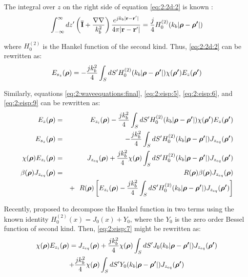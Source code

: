 			The integral over $z$ on the right side of equation \eqref{eq:2:2d:2} is known \citep{balanis2012advanced}:
			\begin{equation}
				\int_{-\infty}^{\infty}dz^\prime\left(\mathbf{\bar{I}} + \frac{\nabla\nabla}{k_b^2}\right) \frac{e^{jk_b|\mathbf{r}-\mathbf{r^\prime}|}}{4\pi|\mathbf{r}-\mathbf{r^\prime}|}  = \frac{j}{4}H_0^{(2)}(k_b|\boldsymbol{\rho}-\boldsymbol{\rho^\prime}|) \label{eq:2:2d:3}
			\end{equation}
		
			\noindent where $H_0^{(2)}$ is the Hankel function of the second kind. Thus, \eqref{eq:2:2d:2} can be rewritten as:
			\begin{equation}
				E_{s_z}(\boldsymbol{\rho}) = -\frac{jk_b^2}{4} \int_S dS^\prime H_0^{(2)}(k_b|\boldsymbol{\rho}-\boldsymbol{\rho^\prime}|) \chi(\boldsymbol{\rho^\prime}) E_z(\boldsymbol{\rho^\prime})\label{eq:2:2d:4}
			\end{equation}
		
			Similarly, equations  \eqref{eq:2:waveequations:final}, \eqref{eq:2:eisp:5}, \eqref{eq:2:eisp:6}, and \eqref{eq:2:eisp:9} can be rewritten as:
			\begin{eqnarray}
				E_z(\boldsymbol{\rho}) &=& E_{z_i}(\boldsymbol{\rho}) - \frac{jk_b^2}{4} \int_S dS^\prime H_0^{(2)}(k_b|\boldsymbol{\rho}-\boldsymbol{\rho^\prime}|) \chi(\boldsymbol{\rho^\prime}) E_z(\boldsymbol{\rho^\prime}) \label{eq:2:2d:5} \\
				E_{s_z}(\boldsymbol{\rho}) &=& -\frac{jk_b^2}{4} \int_S dS^\prime H_0^{(2)}(k_b|\boldsymbol{\rho}-\boldsymbol{\rho^\prime}|) J_{z_{eq}}(\boldsymbol{\rho^\prime}) \label{eq:2:2d:6} \\
				\chi(\boldsymbol{\rho})E_{z_i}(\boldsymbol{\rho}) &=& J_{z_{eq}}(\boldsymbol{\rho}) + \frac{jk_b^2}{4} \chi(\boldsymbol{\rho}) \int_S dS^\prime H_0^{(2)}(k_b|\boldsymbol{\rho}-\boldsymbol{\rho^\prime}|) J_{z_{eq}}(\boldsymbol{\rho^\prime}) \label{eq:2:2d:7} \\
				\beta(\boldsymbol{\rho})J_{z_{eq}}(\boldsymbol{\rho}) &=& R(\boldsymbol{\rho})\beta(\boldsymbol{\rho})J_{z_{eq}}(\boldsymbol{\rho}) \nonumber \\ && +~~ R(\boldsymbol{\rho})\left[ E_{z_i}(\boldsymbol{\rho}) - \frac{jk_b^2}{4} \int_S dS^\prime H_0^{(2)}(k_b|\boldsymbol{\rho}-\boldsymbol{\rho^\prime}|) J_{z_{eq}}(\boldsymbol{\rho^\prime})\right] \label{eq:2:2d:8}
			\end{eqnarray}
		
			Recently, \cite{bevacqua2021effective} proposed to decompose the Hankel function in two terms using the known identity $H^{(2)}_0(x) = J_0(x) + Y_0$, where the $Y_0$ is the zero order Bessel function of second kind. Then, \eqref{eq:2:eisp:7} might be rewritten as:
			\begin{multline}
				\chi(\boldsymbol{\rho})E_{z_i}(\boldsymbol{\rho}) = J_{z_{eq}}(\boldsymbol{\rho}) + \frac{jk_b^2}{4} \chi(\boldsymbol{\rho}) \int_S dS^\prime J_0(k_b|\boldsymbol{\rho}-\boldsymbol{\rho^\prime}|) J_{z_{eq}}(\boldsymbol{\rho^\prime}) \\ + \frac{jk_b^2}{4} \chi(\boldsymbol{\rho}) \int_S dS^\prime Y_0(k_b|\boldsymbol{\rho}-\boldsymbol{\rho^\prime}|) J_{z_{eq}}(\boldsymbol{\rho^\prime})  \label{eq:2:2d:greendecomp:csie}
			\end{multline}
		
